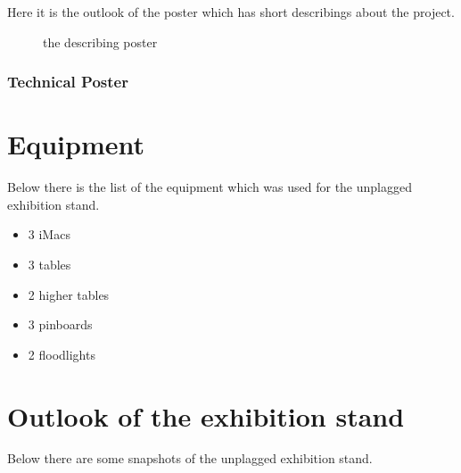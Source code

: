 Here it is the outlook of the poster which has short describings about the project.

\begin{figure}[!h]
  \centering
  \caption{the describing poster}
  \label{fig:poster_describing}
\end{figure}

\subsubsection{Technical Poster}


\section{Equipment}
Below there is the list of the equipment which was used for the unplagged exhibition stand.

\begin{itemize}
\item 3 iMacs
\item 3 tables
\item 2 higher tables
\item 3 pinboards
\item 2 floodlights
\end{itemize}

\section{Outlook of the exhibition stand}
Below there are some snapshots of the unplagged exhibition stand.





